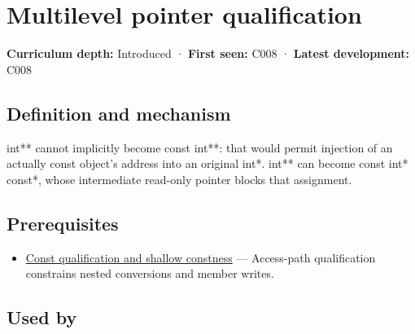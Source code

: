 \hypertarget{appendix-5e1a7561cd98}{}\label{referencestart:appendix-5e1a7561cd98}
\section{Multilevel pointer qualification}\label{appendix-5e1a7561cd98-multilevel-pointer-qualification}

\hypertarget{appendix-5e1a7561cd98-multilevel-pointer-qualification}{}

\textbf{Curriculum depth:} Introduced · \textbf{First seen:} C008 · \textbf{Latest development:} C008

\begin{allmightroledefinition}

\subsection{Definition and mechanism}\label{appendix-5e1a7561cd98-definition-and-mechanism}

\hypertarget{appendix-5e1a7561cd98-definition-and-mechanism}{}

int** cannot implicitly become const int**: that would permit injection of an actually const object's address into an original int*. int** can become const int* const*, whose intermediate read-only pointer blocks that assignment.

\end{allmightroledefinition}

\subsection{Prerequisites}\label{appendix-5e1a7561cd98-prerequisites}

\hypertarget{appendix-5e1a7561cd98-prerequisites}{}

\begin{itemize}
\tightlist
\item
  \hyperref[appendix-c25d60fed375]{Const qualification and shallow constness} --- Access-path qualification constrains nested conversions and member writes.
\end{itemize}

\subsection{Used by}\label{appendix-5e1a7561cd98-used-by}

\hypertarget{appendix-5e1a7561cd98-used-by}{}

